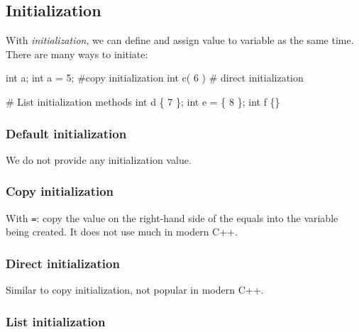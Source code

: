 \documentclass[
  letterpaper,
  DIV=11,
  numbers=noendperiod]{scrreprt}
\newenvironment{Shaded}{\begin{snugshade}}{\end{snugshade}}
\newcommand{\CommentTok}[1]{\textcolor[rgb]{0.37,0.37,0.37}{#1}}
\newcommand{\DecValTok}[1]{\textcolor[rgb]{0.68,0.00,0.00}{#1}}
\newcommand{\FunctionTok}[1]{\textcolor[rgb]{0.28,0.35,0.67}{#1}}
\newcommand{\NormalTok}[1]{\textcolor[rgb]{0.00,0.23,0.31}{#1}}
\newcommand{\OtherTok}[1]{\textcolor[rgb]{0.00,0.23,0.31}{#1}}
\begin{document}
\hypertarget{initialization}{%
\subsection{Initialization}\label{initialization}}

With \emph{initialization}, we can define and assign value to variable
as the same time. There are many ways to initiate:

\begin{Shaded}
\begin{Highlighting}[]
\NormalTok{int a;}
\NormalTok{int a }\OtherTok{=} \DecValTok{5}\NormalTok{;  }\CommentTok{\#copy initialization}
\NormalTok{int }\FunctionTok{c}\NormalTok{( }\DecValTok{6}\NormalTok{ )  }\CommentTok{\# direct initialization}

\CommentTok{\# List initialization methods}
\NormalTok{int d \{ }\DecValTok{7}\NormalTok{ \};}
\NormalTok{int e }\OtherTok{=}\NormalTok{ \{ }\DecValTok{8}\NormalTok{ \};}
\NormalTok{int f \{\}}
\end{Highlighting}
\end{Shaded}

\hypertarget{default-initialization}{%
\subsubsection{Default initialization}\label{default-initialization}}

We do not provide any initialization value.

\hypertarget{copy-initialization}{%
\subsubsection{Copy initialization}\label{copy-initialization}}

With \texttt{=}: copy the value on the right-hand side of the equals
into the variable being created. It does not use much in modern C++.

\hypertarget{direct-initialization}{%
\subsubsection{Direct initialization}\label{direct-initialization}}

Similar to copy initialization, not popular in modern C++.

\hypertarget{list-initialization}{%
\subsubsection{List initialization}\label{list-initialization}}
\end{document}
